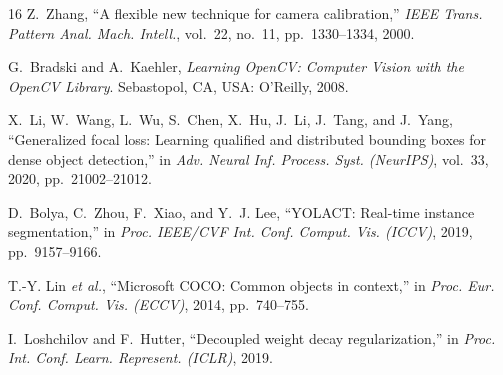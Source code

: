 \documentclass[conference]{IEEEtran}
\begin{document}
\begin{thebibliography}{16}
Z.~Zhang, ``A flexible new technique for camera calibration,'' \emph{IEEE Trans. Pattern Anal. Mach. Intell.}, vol.~22, no.~11, pp.~1330--1334, 2000.

G.~Bradski and A.~Kaehler, \emph{Learning OpenCV: Computer Vision with the OpenCV Library}. Sebastopol, CA, USA: O'Reilly, 2008.

X.~Li, W.~Wang, L.~Wu, S.~Chen, X.~Hu, J.~Li, J.~Tang, and J.~Yang, ``Generalized focal loss: Learning qualified and distributed bounding boxes for dense object detection,'' in \emph{Adv. Neural Inf. Process. Syst. (NeurIPS)}, vol.~33, 2020, pp.~21002--21012.

D.~Bolya, C.~Zhou, F.~Xiao, and Y.~J. Lee, ``YOLACT: Real-time instance segmentation,'' in \emph{Proc. IEEE/CVF Int. Conf. Comput. Vis. (ICCV)}, 2019, pp.~9157--9166.

T.-Y. Lin \emph{et al.}, ``Microsoft COCO: Common objects in context,'' in \emph{Proc. Eur. Conf. Comput. Vis. (ECCV)}, 2014, pp.~740--755.

I.~Loshchilov and F.~Hutter, ``Decoupled weight decay regularization,'' in \emph{Proc. Int. Conf. Learn. Represent. (ICLR)}, 2019.

\end{thebibliography}
\end{document}
